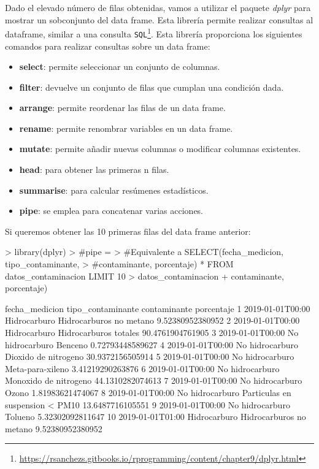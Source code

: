 \documentclass [a4paper] {article}
\begin{document}
Dado el elevado número de filas obtenidas, vamos a utilizar el paquete \textit{dplyr} para mostrar un sobconjunto del data frame. Esta librería permite realizar consultas al dataframe,
similar a una consulta \texttt{SQL}\footnote{\url{https://rsanchezs.gitbooks.io/rprogramming/content/chapter9/dplyr.html}}. Esta librería proporciona los siguientes comandos para realizar
consultas sobre un data frame:
\begin{itemize}
	\item \textbf{select}: permite seleccionar un conjunto de columnas.
	\item \textbf{filter}: devuelve un conjunto de filas que cumplan una condición dada.
	\item \textbf{arrange}: permite reordenar las filas de un data frame.
	\item \textbf{rename}: permite renombrar variables en un data frame.
	\item \textbf{mutate}: permite añadir nuevas columnas o modificar columnas existentes.
	\item \textbf{head}: para obtener las primeras n filas.
	\item \textbf{summarise}: para calcular resúmenes estadísticos.
    \item \textbf{pipe}: se emplea para concatenar varias acciones.
\end{itemize}
\newpage
Si queremos obtener las 10 primeras filas del data frame anterior:
\begin{Schunk}
\begin{Sinput}
> library(dplyr)
> #pipe = %>%
> #Equivalente a SELECT(fecha_medicion, tipo_contaminante, 
> #contaminante, porcentaje) * FROM datos_contaminacion LIMIT 10
> datos_contaminacion %>% select(fecha_medicion, tipo_contaminante, 
+ contaminante, porcentaje) %>% head(10)
\end{Sinput}
\begin{Soutput}
     fecha_medicion tipo_contaminante                     contaminante       porcentaje
1  2019-01-01T00:00      Hidrocarburo          Hidrocarburos no metano 9.52380952380952
2  2019-01-01T00:00      Hidrocarburo            Hidrocarburos totales 90.4761904761905
3  2019-01-01T00:00   No hidrocarburo                          Benceno 0.72793448589627
4  2019-01-01T00:00   No hidrocarburo             Dioxido de nitrogeno 30.9372156505914
5  2019-01-01T00:00   No hidrocarburo                 Meta-para-xileno 3.41219290263876
6  2019-01-01T00:00   No hidrocarburo            Monoxido de nitrogeno 44.1310282074613
7  2019-01-01T00:00   No hidrocarburo                            Ozono 1.81983621474067
8  2019-01-01T00:00   No hidrocarburo Parti­culas en suspension < PM10 13.6487716105551
9  2019-01-01T00:00   No hidrocarburo                          Tolueno 5.32302092811647
10 2019-01-01T01:00      Hidrocarburo          Hidrocarburos no metano 9.52380952380952
\end{Soutput}
\end{Schunk}
\end{document}

